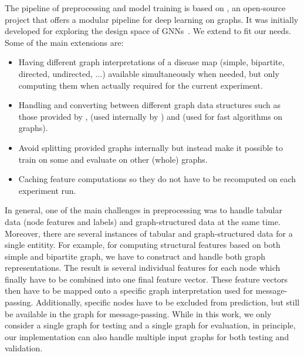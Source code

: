 \documentclass[
	fontsize=10pt, %
	twoside=true, %
	secnumdepth=1, %
  toc=indentunnumbered %
]{kaobook}
\begin{document}
The pipeline of preprocessing and model training is based on 
\cite{noauthor_snap-stanfordgraphgym_2021}, an open-source project that offers a
modular pipeline for deep learning on graphs. It was initially developed for
exploring the design space of GNNs~\cite{you_design_2020}. We extend
 to fit our needs. Some of the main extensions are:
\begin{itemize}
\item Having different graph interpretations of a disease map (simple,
  bipartite, directed, undirected, ...) available simultaneously when needed,
  but only computing them when actually required for the current experiment.
\item Handling and converting between different graph data structures such as
  those provided by ,  (used internally by
  ) and  (used for fast algorithms on graphs).
\item Avoid splitting provided graphs internally but instead make it possible to
  train on some and evaluate on other (whole) graphs.
\item Caching feature computations so they do not have to be recomputed on each
  experiment run.
\end{itemize}

In general, one of the main challenges in preprocessing was to handle tabular
data (node features and labels) and graph-structured data at the same time.
Moreover, there are several instances of tabular and graph-structured data for a
single entitity. For example, for computing structural features based on both
simple and bipartite graph, we have to construct and handle both graph
representations. The result is several individual features for each node which
finally have to be combined into one final feature vector. These feature vectors
then have to be mapped onto a specific graph interpretation used for
message-passing. Additionally, specific nodes have to be excluded from
prediction, but still be available in the graph for message-passing. While in
this work, we only consider a single graph for testing and a single graph for
evaluation, in principle, our implementation can also handle multiple input
graphs for both testing and validation.
\end{document}
